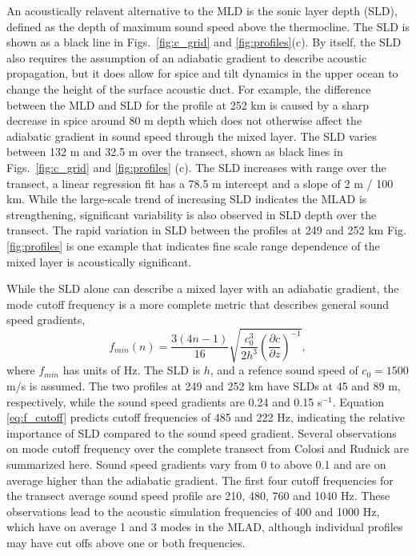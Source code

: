 \documentclass[preprint,NumberedRefs]{JASA}
\begin{document}
An acoustically relavent alternative to the MLD is the sonic layer depth (SLD), defined as the depth of maximum sound speed above the thermocline. The SLD is shown as a black line in Figs.~\ref{fig:c_grid} and \ref{fig:profiles}(c). By itself, the SLD also requires the assumption of an adiabatic gradient to describe acoustic propagation, but it does allow for spice and tilt dynamics in the upper ocean to change the height of the surface acoustic duct. For example, the difference between the MLD and SLD for the profile at 252 km is caused by a sharp decrease in spice around 80 m depth which does not otherwise affect the adiabatic gradient in sound speed through the mixed layer. The SLD varies between 132 m and 32.5 m over the transect, shown as black lines in Figs.~\ref{fig:c_grid} and \ref{fig:profiles} (c). The SLD increases with range over the transect, a linear regression fit has a 78.5 m intercept and a slope of 2 m / 100 km. While the large-scale trend of increasing SLD indicates the MLAD is strengthening, significant variability is also observed in SLD depth over the transect. The rapid variation in SLD between the profiles at 249 and 252 km Fig. \ref{fig:profiles} is one example that indicates fine scale range dependence of the mixed layer is acoustically significant.

While the SLD alone can describe a mixed layer with an adiabatic gradient, the mode cutoff frequency\citep{Urick1982Prop} is a more complete metric that describes general sound speed gradients,
\begin{equation}
    f_{min}(n) = \frac{3(4n-1)}{16} \sqrt{\frac{c_0^3}{2h^3} \left( \frac{\partial c}{\partial z} \right) ^ {-1}},
    \label{eq:f_cutoff}
\end{equation}
where $f_{min}$ has units of Hz. The SLD is $h$, and a refence sound speed of $c_0 = 1500$ m/s is assumed. The two profiles at 249 and 252 km have SLDs at 45 and 89 m, respectively, while the sound speed gradients are 0.24 and 0.15 s$^{-1}$. Equation \eqref{eq:f_cutoff} predicts cutoff frequencies of 485 and 222 Hz, indicating the relative importance of SLD compared to the sound speed gradient. Several observations on mode cutoff frequency over the complete transect from Colosi and Rudnick\cite{colosi2020observations} are summarized here. Sound speed gradients vary from 0 to above 0.1 and are on average higher than the adiabatic gradient. The first four cutoff frequencies for the transect average sound speed profile are 210, 480, 760 and 1040 Hz. These observations lead to the acoustic simulation frequencies of 400 and 1000 Hz, which have on average 1 and 3 modes in the MLAD, although individual profiles may have cut offs above one or both frequencies.
\end{document}
